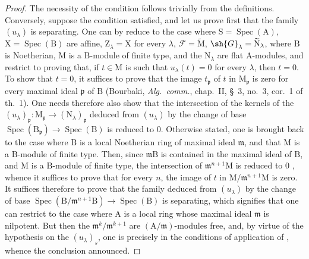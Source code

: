 \begin{proof}
The necessity of the condition follows trivially from the definitions.
Conversely, suppose the condition satisfied, and let us prove first that the family $(u_\lambda)$ is separating.
One can by  reduce to the case where $\mathrm{S}=\operatorname{Spec}(\mathrm{A})$, $\mathrm{X}=\operatorname{Spec}(\mathrm{B})$ are affine, $\mathrm{Z}_\lambda=\mathrm{X}$ for every $\lambda$, $\mathscr{F}=\widetilde{\mathrm{M}}$, $\sh{G}_\lambda=\widetilde{\mathrm{N}}_\lambda$, where $\mathrm{B}$ is Noetherian, $\mathrm{M}$ is a $\mathrm{B}$-module of finite type, and the $\mathrm{N}_\lambda$ are flat $\mathrm{A}$-modules, and restrict to proving that, if $t\in\mathrm{M}$ is such that $u_\lambda(t)=0$ for every $\lambda$, then $t=0$.
To show that $t=0$, it suffices to prove that the image $t_\mathfrak{p}$ of $t$ in $\mathrm{M}_\mathfrak{p}$ is zero for every maximal ideal $\mathfrak{p}$ of $\mathrm{B}$ (Bourbaki, \emph{Alg.\ comm.}, chap.~II, \S~3, no.~3, cor.~1 of th.~1).
One needs therefore also show that the intersection
of the kernels of the $(u_\lambda)_\mathfrak{p}:\mathrm{M}_\mathfrak{p}\to(\mathrm{N}_\lambda)_\mathfrak{p}$ deduced from $(u_\lambda)$ by the change of base $\operatorname{Spec}(\mathrm{B}_\mathfrak{p})\to\operatorname{Spec}(\mathrm{B})$ is reduced to $0$.
Otherwise stated, one is brought back to the case where $\mathrm{B}$ is a local Noetherian ring of maximal ideal $\mathfrak{m}$, and that $\mathrm{M}$ is a $\mathrm{B}$-module of finite type.
Then, since $\mathfrak{m}\mathrm{B}$ is contained in the maximal ideal of $\mathrm{B}$, and $\mathrm{M}$ is a $\mathrm{B}$-module of finite type, the intersection of $\mathfrak{m}^{n+1}\mathrm{M}$ is reduced to $0$ , whence it suffices to prove that for every $n$, the image of $t$ in $\mathrm{M}/\mathfrak{m}^{n+1}\mathrm{M}$ is zero.
It suffices therefore to prove that the family deduced from $(u_\lambda)$ by the change of base $\operatorname{Spec}(\mathrm{B}/\mathfrak{m}^{n+1}\mathrm{B})\to\operatorname{Spec}(\mathrm{B})$ is separating, which signifies that one can restrict to the case where $\mathrm{A}$ is a local ring whose maximal ideal $\mathfrak{m}$ is nilpotent.
But then the $\mathfrak{m}^k/\mathfrak{m}^{k+1}$ are $(\mathrm{A}/\mathfrak{m})$-modules free, and, by virtue of the hypothesis on the $(u_\lambda)_s$, one is precisely in the conditions of application of , whence the conclusion announced.


\end{proof}
